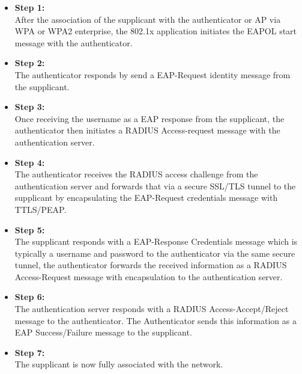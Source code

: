 \begin{itemize}
	\item \textbf{Step 1:} 
	\\ After the association of the supplicant with the authenticator or AP via WPA or WPA2 enterprise, the 802.1x application initiates the EAPOL start message with the authenticator. 
	\item \textbf{Step 2:} 
	\\ The authenticator responds by send a EAP-Request identity message from the supplicant. 
	\item \textbf{Step 3:}
	\\ Once receiving the username as a EAP response from the supplicant, the authenticator then initiates a RADIUS Access-request message with the authentication server. 
	\item \textbf{Step 4:}
	\\ The authenticator receives the RADIUS access challenge from the authentication server and forwards that via a secure SSL/TLS tunnel to the supplicant by encapsulating the EAP-Request credentials message with TTLS/PEAP.
	\item \textbf{Step 5:}
	\\ The supplicant responds with a EAP-Response Credentials message which is typically a username and password to the authenticator via the same secure tunnel, the authenticator forwards the received information as a RADIUS Access-Request message with encapsulation to the authentication server. 
	\item \textbf{Step 6:}
	\\ The authentication server responds with a RADIUS Access-Accept/Reject message to the authenticator. The Authenticator sends this information as a EAP Success/Failure message to the supplicant. 
	\item \textbf{Step 7:}
	\\ The supplicant is now fully associated with the network.
	
\end{itemize}
